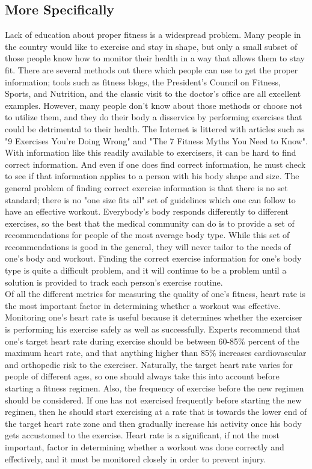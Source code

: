 \documentclass[letterpaper,english, 12pt]{scrreprt}
\begin{document}
\subsection{More Specifically}
Lack of education about proper fitness is a widespread problem. Many people in the country would like to exercise and stay in shape, but only a small subset of those people know how to monitor their health in a way that allows them to stay fit. There are several methods out there which people can use to get the proper information; tools such as fitness blogs, the President's Council on Fitness, Sports, and Nutrition, and the classic visit to the doctor's office are all excellent examples. However, many people don't know about those methods or choose not to utilize them, and they do their body a disservice by performing exercises that could be detrimental to their health. The Internet is littered with articles such as "9 Exercises You're Doing Wrong" and "The 7 Fitness Myths You Need to Know". With information like this readily available to exercisers, it can be hard to find correct information. And even if one does find correct information, he must check to see if that information applies to a person with his body shape and size. The general problem of finding correct exercise information is that there is no set standard; there is no "one size fits all" set of guidelines which one can follow to have an effective workout. Everybody's body responds differently to different exercises, so the best that the medical community can do is to provide a set of recommendations for people of the most average body type. While this set of recommendations is good in the general, they will never tailor to the needs of one's body and workout. Finding the correct exercise information for one's body type is quite a difficult problem, and it will continue to be a problem until a solution is provided to track each person's exercise routine.\\
 
Of all the different metrics for measuring the quality of one's fitness, heart rate is the most important factor in determining whether a workout was effective. Monitoring one's heart rate is useful because it determines whether the exerciser is performing his exercise safely as well as successfully. Experts recommend that one's target heart rate during exercise should be between 60-85\% percent of the maximum heart rate, and that anything higher than 85\% increases cardiovascular and orthopedic risk to the exerciser. Naturally, the target heart rate varies for people of different ages, so one should always take this into account before starting a fitness regimen. Also, the frequency of exercise before the new regimen should be considered. If one has not exercised frequently before starting the new regimen, then he should start exercising at a rate that is towards the lower end of the target heart rate zone and then gradually increase his activity once his body gets accustomed to the exercise. Heart rate is a significant, if not the most important, factor in determining whether a workout was done correctly and effectively, and it must be monitored closely in order to prevent injury.\\
 
\end{document}
